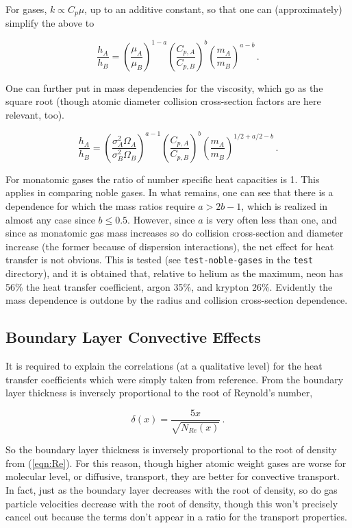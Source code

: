 \documentclass{article}
\begin{document}
For gases, $k \propto C_p \mu$, up to an additive constant, so that one can
(approximately) simplify the above to

$$\frac{h_A}{h_B} = \left(\frac{\mu_A}{\mu_B}\right)^{1-a} \left(\frac{C_{p, A}}{C_{p, B}}\right)^b \left(\frac{m_A}{m_B}\right)^{a-b} \,.$$

One can further put in mass dependencies for the viscosity, which go as the
square root (though atomic diameter collision cross-section factors are here
relevant, too). 

$$\frac{h_A}{h_B} = \left(\frac{\sigma_A^2 \Omega_A}{\sigma_B^2 \Omega_B}\right)^{a-1} \left(\frac{C_{p, A}}{C_{p, B}}\right)^b \left(\frac{m_A}{m_B}\right)^{1/2 + a/2 -b} \,.$$

For monatomic gases the ratio of number specific heat capacities is 1. This
applies in comparing noble gases. In what remains, one can see that there is a
dependence for which the mass ratios require $a > 2b - 1$, which is realized in
almost any case since $b \leq 0.5$. However, since $a$ is very often less than
one, and since as monatomic gas mass increases so do collision cross-section
and diameter increase (the former because of dispersion interactions), the net
effect for heat transfer is not obvious. This is tested (see
\texttt{test-noble-gases} in the \texttt{test} directory), and it is obtained
that, relative to helium as the maximum, neon has 56\% the heat transfer
coefficient, argon 35\%, and krypton 26\%. Evidently the mass dependence is
outdone by the radius and collision cross-section dependence.

\subsection{Boundary Layer Convective Effects}

It is required to explain the correlations (at a qualitative level) for the heat transfer coefficients
which were simply taken from reference. From \cite[eqn.~7.19]{incropera1996fundamentals} the boundary
layer thickness is inversely proportional to the root of Reynold's number,

\begin{equation}\label{eqn:boundary-layer-thickness}
\delta(x) = \frac{5 x}{\sqrt{N_{Re}(x)}} \,.
\end{equation}

So the boundary layer thickness is inversely proportional to the
root of density from (\ref{eqn:Re}). For this reason, though higher
atomic weight gases are worse for molecular level, or diffusive,
transport, they are better for convective transport. In fact, just
as the boundary layer decreases with the root of density, so do gas
particle velocities decrease with the root of density, though this won't
precisely cancel out because the terms don't appear in a ratio for the
transport properties.
\end{document}
